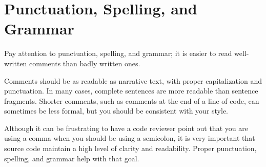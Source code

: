 
\section{Punctuation, Spelling, and Grammar}\label{sec:punctuation-spelling-and-grammar}
Pay attention to punctuation, spelling, and grammar; it is easier to read well-written comments than badly written ones.

Comments should be as readable as narrative text, with proper capitalization and punctuation. In many cases, complete sentences are more readable than sentence fragments. Shorter comments, such as comments at the end of a line of code, can sometimes be less formal, but you should be consistent with your style.

Although it can be frustrating to have a code reviewer point out that you are using a comma when you should be using a semicolon, it is very important that source code maintain a high level of clarity and readability. Proper punctuation, spelling, and grammar help with that goal.
